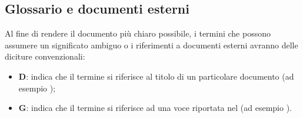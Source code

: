 \subsection{Glossario e documenti esterni}
Al fine di rendere il documento più chiaro possibile, i termini che possono assumere un significato ambiguo o i riferimenti a documenti esterni
avranno delle diciture convenzionali:

\begin{itemize}
    \item \textbf{D}: indica che il termine si riferisce al titolo di un particolare documento (ad esempio \Doc{\PdPv});
    \item \textbf{G}: indica che il termine si riferisce ad una voce riportata nel \Doc{\Glv} (ad esempio ).
\end{itemize}
